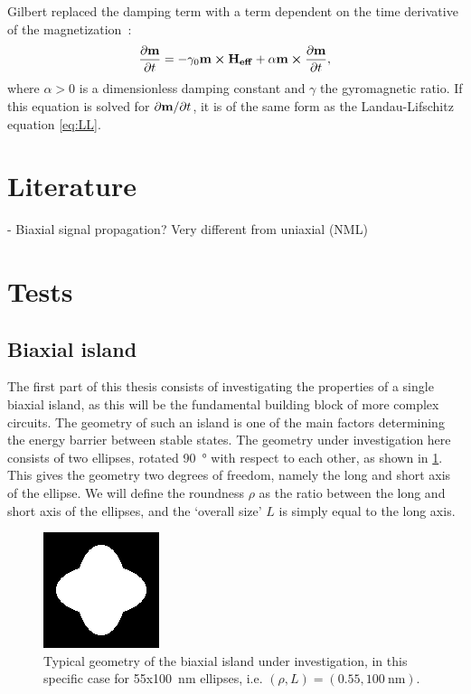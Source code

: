 \documentclass[10pt,a4paper]{article}
\begin{document}
Gilbert \cite{Gilbert1955anomalous} replaced the damping term with a term dependent on the time derivative of the magnetization~\cite{ThermFluc_SingleDomain, phd_leliaert, LEL-17b}:
\begin{equation}
	\frac{\partial \vb{m}}{\partial t} = - \gamma_0\vb{m} \cross \vb{H_{eff}} + \alpha \vb{m} \cross \frac{\partial \vb{m}}{\partial t} \mathrm{,}
	\label{eq:LLG}
\end{equation}
where $\alpha>0$ is a dimensionless damping constant and $\gamma$ the gyromagnetic ratio. If this equation is solved for $\partial \vb{m}/\partial t$, it is of the same form as the Landau-Lifschitz equation \eqref{eq:LL}.~\cite{ThermFluc_SingleDomain}  

\section{Literature}
- Biaxial signal propagation? Very different from uniaxial (NML)


\section{Tests}
\subsection{Biaxial island}
The first part of this thesis consists of investigating the properties of a single biaxial island, as this will be the fundamental building block of more complex circuits. The geometry of such an island is one of the main factors determining the energy barrier between stable states. The geometry under investigation here consists of two ellipses, rotated \SI{90}{\degree} with respect to each other, as shown in \cref{fig:biaxial_island:geometryTypical}. This gives the geometry two degrees of freedom, namely the long and short axis of the ellipse. We will define the roundness $\rho$ as the ratio between the long and short axis of the ellipses, and the `overall size' $L$ is simply equal to the long axis.
\begin{figure}
    \centering
    \includegraphics[width=0.3\columnwidth]{Figures/biaxial_island/Geometry/geomPlus55.png}
    \caption{Typical geometry of the biaxial island under investigation, in this specific case for 55x\SI{100}{\nano\metre} ellipses, i.e. $(\rho, L)=(0.55, \SI{100}{\nano\metre})$.}
    \label{fig:biaxial_island:geometryTypical}
\end{figure}
\end{document}
